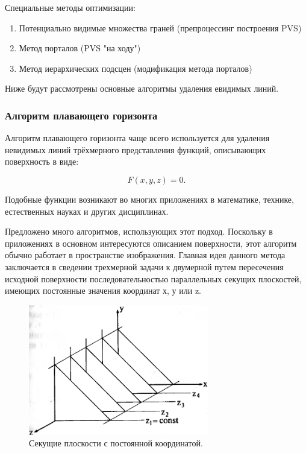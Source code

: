 Специальные методы оптимизации:

\begin{enumerate}
	\item Потенциально видимые множества граней (препроцессинг построения PVS)
	\item Метод порталов (PVS "на ходу")
	\item Метод иерархических подсцен (модификация метода порталов)~\cite{tyrlapov}
\end{enumerate}

Ниже будут рассмотрены основные алгоритмы удаления  евидимых линий.



\subsubsection{Алгоритм плавающего горизонта}

\hspace{1.25cm}
Алгоритм плавающего горизонта чаще всего используется для удаления невидимых линий трёхмерного представления функций, описывающих поверхность в виде:

\[ F(x, y, z) = 0. \]

Подобные функции возникают во многих приложениях в математике, технике, естественных науках и других дисциплинах.

Предложено много алгоритмов, использующих этот подход. Поскольку в приложениях в основном интересуются описанием поверхности, этот алгоритм обычно работает в пространстве изображения. Главная идея данного метода заключается в сведении трехмерной задачи к двумерной путем пересечения исходной поверхности последовательностью параллельных секущих плоскостей, имеющих постоянные значения координат х, у или z.

\begin{figure}[H]
    \centering
    \includegraphics[width=0.7\textwidth]{img/floating_horizon_1.png}
    \caption{Секущие плоскости с постоянной координатой.}
    \label{fig:floating_horizon_1}
\end{figure}

